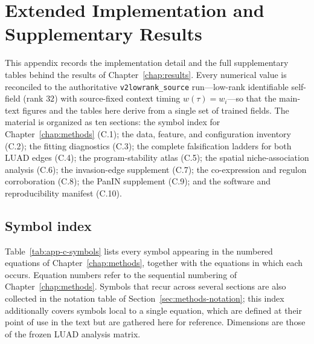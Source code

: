 
\chapter{Extended Implementation and Supplementary Results}\label{chap:appendix-c}

This appendix records the implementation detail and the full supplementary tables behind the
results of Chapter~\ref{chap:results}. Every numerical value is reconciled to the authoritative
\texttt{v2lowrank\_source} run---low-rank identifiable self-field (rank $32$) with source-fixed
context timing $w(\tau)=w_i$---so that the main-text figures and the tables here derive from a single
set of trained fields. The material is organized as ten sections: the symbol index for
Chapter~\ref{chap:methods} (C.1); the data, feature, and configuration inventory (C.2); the fitting
diagnostics (C.3); the complete falsification ladders for both LUAD edges (C.4); the
program-stability atlas (C.5); the spatial niche-association analysis (C.6); the invasion-edge
supplement (C.7); the co-expression and regulon corroboration (C.8); the PanIN supplement (C.9); and
the software and reproducibility manifest (C.10).

\section{Symbol index}\label{sec:app-c-symbols}

Table~\ref{tab:app-c-symbols} lists every symbol appearing in the numbered
equations of Chapter~\ref{chap:methods}, together with the equations in which
each occurs. Equation numbers refer to the sequential numbering of
Chapter~\ref{chap:methods}. Symbols that recur across several sections are also
collected in the notation table of Section~\ref{sec:methods-notation}; this
index additionally covers symbols local to a single equation, which are defined
at their point of use in the text but are gathered here for reference.
Dimensions are those of the frozen LUAD analysis matrix.

